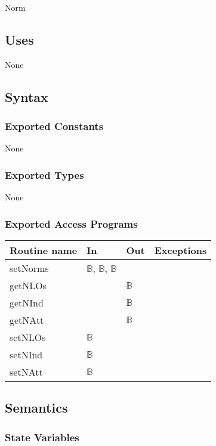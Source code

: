 \documentclass[12pt]{article}
\begin{document}
Norm

\subsection* {Uses}

None

\subsection* {Syntax}

\subsubsection* {Exported Constants}

None

\subsubsection* {Exported Types}

None

\subsubsection* {Exported Access Programs}

\begin{tabular}{| l | l | l | p{5cm} |}
  \hline
  \textbf{Routine name} & \textbf{In} & \textbf{Out} & \textbf{Exceptions}\\
  \hline
  setNorms & $\mathbb{B}$, $\mathbb{B}$, $\mathbb{B}$ & & \\
  \hline
  getNLOs & & $\mathbb{B}$ & \\
  \hline
  getNInd & & $\mathbb{B}$ & \\
  \hline
  getNAtt & & $\mathbb{B}$ & \\
  \hline
  setNLOs & $\mathbb{B}$ & & \\
  \hline
  setNInd & $\mathbb{B}$ & & \\
  \hline
  setNAtt & $\mathbb{B}$ & & \\
  \hline
  
\end{tabular}

\subsection* {Semantics}

\subsubsection* {State Variables}
\end{document}
